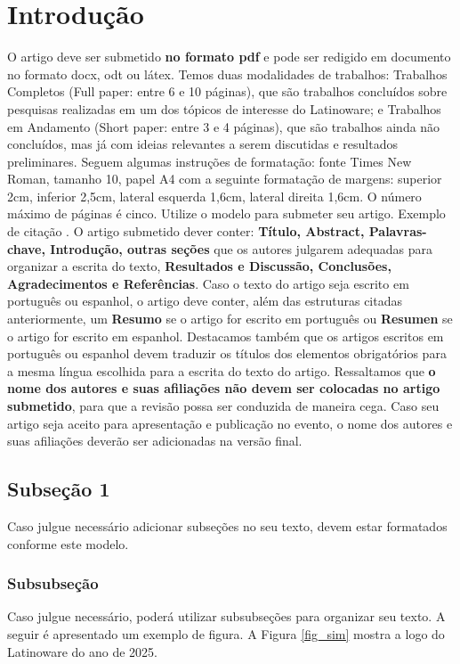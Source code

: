\documentclass[10pt,conference]{IEEEtran}
\begin{document}
\section{Introdução}
O artigo deve ser submetido \textbf{no formato pdf} e pode ser redigido em documento no formato docx, odt ou látex. Temos duas modalidades de trabalhos: Trabalhos Completos (Full paper: entre 6 e 10 páginas), que são trabalhos concluídos sobre pesquisas realizadas em um dos tópicos de interesse do Latinoware; e Trabalhos em Andamento (Short paper: entre 3 e 4 páginas), que são trabalhos ainda não concluídos, mas já com ideias relevantes a serem discutidas e resultados preliminares. Seguem algumas instruções de formatação: fonte Times New Roman, tamanho 10, papel A4 com a seguinte formatação de margens: superior 2cm, inferior 2,5cm, lateral esquerda 1,6cm, lateral direita 1,6cm. O número máximo de páginas é cinco. Utilize o modelo para submeter seu artigo. Exemplo de citação \cite{nascimento2023aplicaccao}. O artigo submetido dever conter: \textbf{Título, Abstract, Palavras-chave, Introdução, outras  seções} que os autores julgarem adequadas para organizar a escrita do texto, \textbf{Resultados e Discussão, Conclusões, Agradecimentos e Referências}. Caso o texto do artigo seja escrito em português ou espanhol, o artigo deve conter, além das estruturas citadas anteriormente, um \textbf{Resumo} se o artigo for escrito em português ou \textbf{Resumen} se o artigo for escrito em espanhol. Destacamos também que os artigos escritos em português ou espanhol devem traduzir os títulos dos elementos obrigatórios para a mesma língua escolhida para a escrita do texto do artigo. Ressaltamos que  \textbf{o nome dos autores e suas afiliações não devem ser colocadas no artigo submetido}, para que a revisão possa ser conduzida de maneira cega. Caso seu artigo seja aceito para apresentação e publicação no evento, o nome dos autores e suas afiliações deverão ser adicionadas na versão final.

\subsection{Subseção 1}
Caso julgue necessário adicionar subseções no seu texto, devem estar formatados conforme este modelo.

\subsubsection{Subsubseção}
Caso julgue necessário, poderá utilizar subsubseções para organizar seu texto. A seguir é apresentado um exemplo de figura. A Figura \ref{fig_sim} mostra a logo do Latinoware do ano de 2025. 
\end{document}
